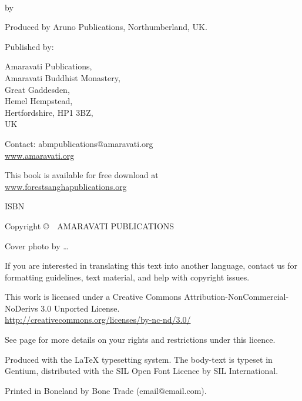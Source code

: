 {\small\setlength{\parskip}{0.8em}\setlength{\parindent}{0em}%
{\raggedright%

\thetitle\\
by \theauthor

Produced by Aruno Publications, Northumberland, UK.

Published by:

Amaravati Publications,\\
Amaravati Buddhist Monastery,\\
Great Gaddesden, \\
Hemel Hempstead, \\
Hertfordshire, HP1 3BZ,\\
UK

Contact: abmpublications@amaravati.org\\
\href{http://amaravati.org}{www.amaravati.org}

This book is available for free download at\\
\href{http://forestsanghapublications.org/}{www.forestsanghapublications.org}

ISBN \theISBN

Copyright \copyright\ \the\year\ AMARAVATI PUBLICATIONS

Cover photo by \ldots

\vfill

{\footnotesize
If you are interested in translating this text into another language, contact us for formatting guidelines, text material, and help with copyright issues.

This work is licensed under a Creative Commons Attribution-NonCommercial-NoDerivs 3.0 Unported License.\\
\href{http://creativecommons.org/licenses/by-nc-nd/3.0/}{http://creativecommons.org/licenses/by-nc-nd/3.0/}

See page \pageref{copyright-details} for more details on your rights and restrictions under this licence.

Produced with the {\selectfont\LaTeX} typesetting system. The body-text is typeset in Gentium, distributed with the SIL Open Font Licence by SIL International.

\theEditionInfo

Printed in Boneland by Bone Trade (email@email.com).

}

}}

